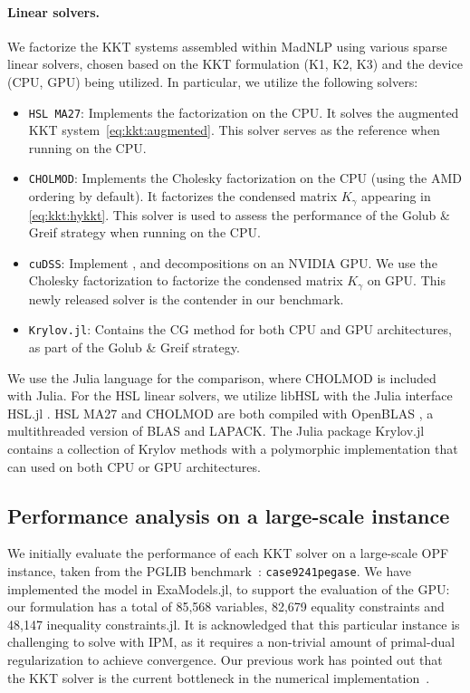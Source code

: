 \paragraph{Linear solvers.}
We factorize the KKT systems assembled within MadNLP using various sparse linear solvers, chosen based on the KKT formulation (K1, K2, K3) and the device (CPU, GPU) being utilized.
In particular, we utilize the following solvers:
\begin{itemize}
  \item {\tt HSL MA27}: Implements the \lblt factorization on the CPU.
    It solves the augmented KKT system~\eqref{eq:kkt:augmented}.
    This solver serves as the reference when running on the CPU.
  \item {\tt CHOLMOD}: Implements the Cholesky factorization on the CPU
    (using the AMD ordering \cite{amestoy-david-duff-2004} by default).
    It factorizes the condensed matrix $K_\gamma$ appearing in \eqref{eq:kkt:hykkt}.
    This solver is used to assess the performance of the Golub \& Greif strategy when running on the CPU.
  \item {\tt cuDSS}: Implement \llt, \ldlt and \lu decompositions on an NVIDIA GPU.
    We use the Cholesky factorization to factorize the condensed matrix $K_\gamma$ on GPU.
    This newly released solver is the contender in our benchmark.
  \item {\tt Krylov.jl}: Contains the CG method for both CPU and GPU architectures, as part of the Golub \& Greif strategy.
\end{itemize}

We use the Julia language \cite{bezanson-edelman-karpinski-shah-2017} for the comparison, where CHOLMOD \cite{chen-davis-hager-rajamanickam-2008} is included with Julia.
For the HSL linear solvers, we utilize libHSL \cite{fowkes-lister-montoison-orban-2024} with the Julia interface HSL.jl \cite{montoison-orban-hsl-2021}.
HSL MA27 and CHOLMOD are both compiled with OpenBLAS \cite{openblas}, a multithreaded version of BLAS and LAPACK.
The Julia package Krylov.jl~\cite{montoison2023krylov} contains a collection of Krylov methods with a polymorphic implementation that can used on both CPU or GPU architectures.

\subsection{Performance analysis on a large-scale instance}
We initially evaluate the performance of each KKT solver on a large-scale OPF instance, taken from
the PGLIB benchmark~\cite{babaeinejadsarookolaee2019power}: {\tt case9241pegase}.
We have implemented the model in ExaModels.jl, to support
the evaluation of the GPU: our formulation has
a total of 85,568 variables, 82,679 equality constraints and 48,147
inequality constraints.jl.
It is acknowledged that this particular instance is challenging to solve
with IPM, as it requires a non-trivial amount of primal-dual regularization
to achieve convergence.
Our previous work has pointed out that the KKT solver is the current bottleneck
in the numerical implementation~\cite{shin2023accelerating}.

